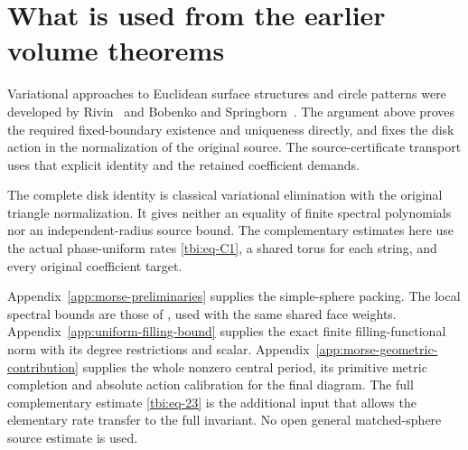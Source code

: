 \section{What is used from the earlier volume theorems}\label{tbi:sec-9}

Variational approaches to Euclidean surface structures and circle patterns were developed by Rivin~\cite{Rivin1994} and Bobenko and Springborn~\cite{BobenkoSpringborn2004}. The argument above proves the required fixed-boundary existence and uniqueness directly, and fixes the disk action in the normalization of the original source. The source-certificate transport uses that explicit identity and the retained coefficient demands.

The complete disk identity is classical variational elimination with the original triangle normalization. It gives neither an equality of finite spectral polynomials nor an independent-radius source bound. The complementary estimates here use the actual phase-uniform rates \eqref{tbi:eq-C1}, a shared torus for each string, and every original coefficient target.

Appendix~\ref{app:morse-preliminaries} supplies the simple-sphere
packing. The local spectral bounds are those of
\cite[Theorem 1.1]{CasimirSources}, used with the same shared face
weights. Appendix~\ref{app:uniform-filling-bound} supplies the exact finite filling-functional norm with its degree restrictions and scalar. Appendix~\ref{app:morse-geometric-contribution} supplies the whole nonzero central period, its primitive metric completion and absolute action calibration for the final diagram. The full complementary estimate \eqref{tbi:eq-23} is the additional input that allows the elementary rate transfer to the full invariant. No open general matched-sphere source estimate is used.
